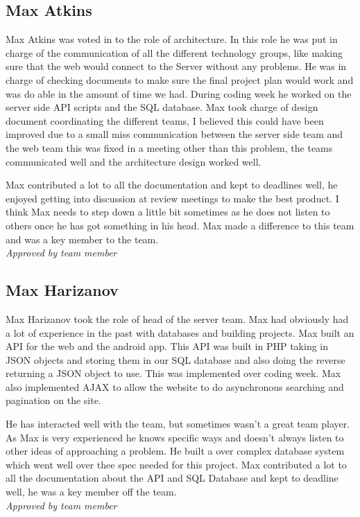 \subsection{Max Atkins}
    Max Atkins was voted in to the role of architecture. In this role he was put in charge of the communication of all the different technology groups, like making sure that the web would connect to the Server without any problems. He was in charge of checking documents to make sure the final project plan would work and was do able in the amount of time we had. During coding week he worked on the server side API scripts and the SQL database. Max took charge of design document coordinating the different teams, I believed this could have been improved due to a small miss communication between the server side team and the web team this was fixed in a meeting other than this problem, the teams communicated well and the architecture design worked well.

    Max contributed a lot to all the documentation and kept to deadlines well, he enjoyed getting into discussion at review meetings to make the best product. I think Max needs to step down a little bit sometimes as he does not listen to others once he has got something in his head. Max made a difference to this team and was a key member to the team.\\
    \emph{Approved by team member}

\subsection{Max Harizanov}
    Max Harizanov took the role of head of the server team. Max had obviously had a lot of experience in the past with databases and building projects. Max built an API for the web and the android app. This API was built in PHP taking in JSON objects and storing them in our SQL database and also doing the reverse returning a JSON object to use. This was implemented over coding week.  Max also implemented AJAX to allow the website to do asynchronous searching and pagination on the site. 

    He has interacted well with the team, but sometimes wasn't a great team player. As Max is very experienced he knows specific ways and doesn't always listen to other ideas of approaching a problem. He built a over complex database system which went well over thee spec needed for this project. Max contributed a lot to all the documentation about the API and SQL Database and kept to deadline well, he was a key member off the team.\\
    \emph{Approved by team member}

